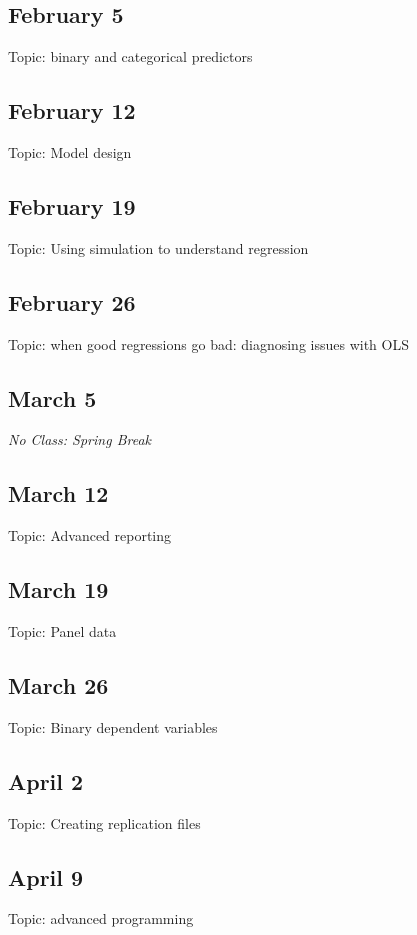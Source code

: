 \documentclass[12pt]{article}
\begin{document}
\subsection{February 5}

Topic: binary and categorical predictors

\subsection{February 12}

Topic: Model design

\subsection{February 19}

Topic: Using simulation to understand regression

\subsection{February 26}

Topic: when good regressions go bad: diagnosing issues with OLS

\subsection{March 5}

\textit{No Class: Spring Break}

\subsection{March 12}

Topic: Advanced reporting

\subsection{March 19}

Topic: Panel data

\subsection{March 26}

Topic: Binary dependent variables

\subsection{April 2}

Topic: Creating replication files

\subsection{April 9}

Topic: advanced programming

  
\end{document}
